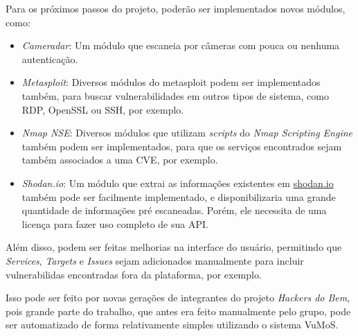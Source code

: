 Para os próximos passos do projeto, poderão ser implementados novos módulos, como:
\begin{itemize}
    \item \emph{Cameradar}: Um módulo que escaneia por câmeras com pouca ou nenhuma autenticação.
    \item \emph{Metasploit}: Diversos módulos do metasploit podem ser implementados também, para buscar vulnerabilidades em outros tipos de sistema, como RDP, OpenSSL ou SSH, por exemplo.
    \item \emph{Nmap NSE}: Diversos módulos que utilizam \textit{scripts} do \textit{Nmap Scripting Engine} também podem ser implementados, para que os serviços encontrados sejam também associados a uma CVE, por exemplo.
    \item \emph{Shodan.io}: Um módulo que extrai as informações existentes em \url{shodan.io} também pode ser facilmente implementado, e disponibilizaria uma grande quantidade de informações pré escaneadas. Porém, ele necessita de uma licença para fazer uso completo de sua API.
\end{itemize}

Além disso, podem ser feitas melhorias na interface do usuário, permitindo que \textit{Services}, \textit{Targets} e \textit{Issues} sejam adicionados manualmente para incluir vulnerabilidas encontradas fora da plataforma, por exemplo. 

Isso pode ser feito por novas gerações de integrantes do projeto \textit{Hackers do Bem}, pois grande parte do trabalho, que antes era feito manualmente pelo grupo, pode ser automatizado de forma relativamente simples utilizando o sistema VuMoS.